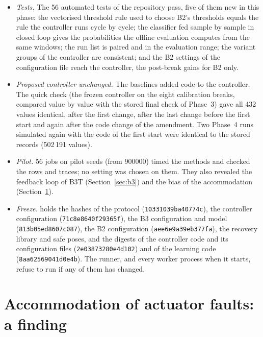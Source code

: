 \documentclass[10pt]{article}
\begin{document}
\begin{itemize}
\item \emph{Tests.} The 56 automated tests of the repository pass, five of them new in this phase: the vectorised threshold rule used to choose B2's thresholds equals the rule the controller runs cycle by cycle; the classifier fed sample by sample in closed loop gives the probabilities the offline evaluation computes from the same windows; the run list is paired and in the evaluation range; the variant groups of the controller are consistent; and the B2 settings of the configuration file reach the controller, the post-break gains for B2 only.
\item \emph{Proposed controller unchanged.} The baselines added code to the controller. The quick check (the frozen controller on the eight calibration breaks, compared value by value with the stored final check of Phase~3) gave all 432 values identical, after the first change, after the last change before the first start and again after the code change of the amendment. Two Phase~4 runs simulated again with the code of the first start were identical to the stored records (502\,191 values).
\item \emph{Pilot.} 56 jobs on pilot seeds (from 900000) timed the methods and checked the rows and traces; no setting was chosen on them. They also revealed the feedback loop of B3T (Section~\ref{sec:b3}) and the bias of the accommodation (Section~\ref{sec:deficit}).
\item \emph{Freeze.}  holds the hashes of the protocol (\texttt{10331039ba40774c}), the controller configuration (\texttt{71c8e8640f29365f}), the B3 configuration and model (\texttt{813b05ed8607c087}), the B2 configuration (\texttt{aee6e9a39eb377fa}), the recovery library and safe poses, and the digests of the controller code and its configuration files (\texttt{2e03873280e4d102}) and of the learning code (\texttt{8aa62569041d0e4b}). The runner, and every worker process when it starts, refuse to run if any of them has changed.
\end{itemize}

\section{Accommodation of actuator faults: a finding}\label{sec:deficit}
\end{document}

